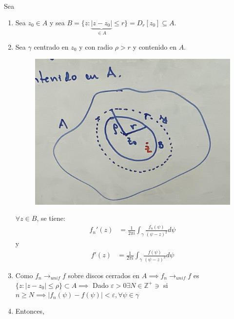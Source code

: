 \begin{teorema}
    \begin{dem}
        Sea 
        \begin{enumerate}
            \item Sea $z_0\in A$ y sea $B=\{z:\underbrace{|z-z_0|}_{\in A}\leq r\}=D_r[z_0]\subseteq A$. 
            \item Sea $\gamma$ centrado en $z_0$ y con radio $\rho >r$ y contenido en $A$. 
            \begin{figure}[H]
                \centering
                \includegraphics[scale=0.1]{imagenes/19.1.jpeg}
            \end{figure}
            $\forall z\in B$, se tiene: 
            \begin{align*}
                f_n'(z) &= \frac{1}{2\pi i}\int_\gamma \frac{f_n(\psi)}{(\psi - z)^2}d\psi 
            \end{align*}
            y 
            \begin{align*}
                f'(z) &= \frac{1}{2\pi i}\int_\gamma \frac{f(\psi)}{(\psi - z)^2}d\psi 
            \end{align*}
            \item Como $f_n\to_{unif} f$ sobre discos cerrados en $A\implies f_n\to_{unif}f$ es $\{z:|z-z_0|\leq \rho\}\subset A\implies$ Dado $\varepsilon>0\exists N\in \mathbb{Z}^+\ni$ si $n\geq N\implies |f_n(\psi)-f(\psi)|<\varepsilon,\forall \psi \in \gamma$
            \item Entonces, 
            

\end{enumerate}
\end{dem}
\end{teorema}
